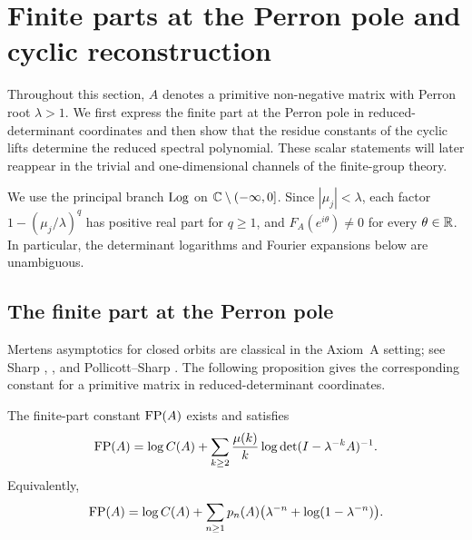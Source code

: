 \section{Finite parts at the Perron pole and cyclic reconstruction}
\label{sec:finite-part}

Throughout this section, \(A\) denotes a primitive non-negative matrix
with Perron root \(\lambda>1\). We first express the finite part at the
Perron pole in reduced-determinant coordinates and then show that the
residue constants of the cyclic lifts determine the reduced spectral
polynomial. These scalar statements will later reappear in the trivial
and one-dimensional channels of the finite-group theory.

We use the principal branch \(\operatorname{Log}\) on
\(\mathbb{C}\setminus(-\infty,0]\). Since \(|\mu_j|<\lambda\), each factor
\(1-(\mu_j/\lambda)^q\) has positive real part for \(q\ge 1\), and
\(F_A(e^{i\theta})\neq 0\) for every \(\theta\in\mathbb{R}\). In particular,
the determinant logarithms and Fourier expansions below are
unambiguous.

\subsection{The finite part at the Perron pole}

Mertens asymptotics for closed orbits are classical in the Axiom~A
setting; see Sharp \cite{Sharp1991Mertens},
\cite{Sharp1993PrimeOrbitAnnals}, and Pollicott--Sharp
\cite{PollicottSharp1998Mertens}. The following proposition gives the
corresponding constant for a primitive matrix in
reduced-determinant coordinates.

\begin{proposition}
  \label{thm:finite-part-primitive-closed-form}
  The finite-part constant \(\operatorname{FP}(A)\) exists and satisfies
  \[
    \operatorname{FP}(A)
    =\log C(A)+\sum_{k\ge 2}\frac{\mu(k)}{k}
      \log\det(I-\lambda^{-k}A)^{-1}.
  \]
  Equivalently,
  \[
    \operatorname{FP}(A)
    =\log C(A)
      +\sum_{n\ge 1}p_n(A)
        \bigl(\lambda^{-n}+\log(1-\lambda^{-n})\bigr).
  \]
\end{proposition}

